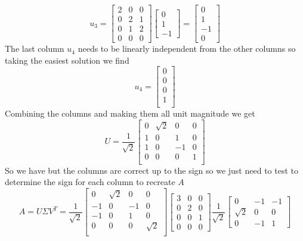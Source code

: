 \documentclass{article}
\begin{document}
$$u_3 =
\begin{bmatrix}
2 & 0 & 0 \\
0 & 2 & 1 \\
0 & 1 & 2 \\
0 & 0 & 0
\end{bmatrix}
\begin{bmatrix}
0 \\
1 \\
-1
\end{bmatrix}
=
\begin{bmatrix}
0 \\
1 \\
-1 \\
0
\end{bmatrix}
$$
The last column $u_4$ needs to be linearly independent from the other columns so taking the easiest solution we find
$$u_4 =
\begin{bmatrix}
0 \\
0 \\
0 \\
1 \\
\end{bmatrix}
$$
Combining the columns and making them all unit magnitude we get
$$ U =
\frac{1}{\sqrt{2}}
\begin{bmatrix}
0 & \sqrt{2} & 0 & 0 \\
1 & 0 & 1 & 0 \\
1 & 0 & -1 & 0 \\
0 & 0 & 0 & 1 \\
\end{bmatrix}
$$
So we have but the columns are correct up to the sign so we just need to test to determine the sign for each column to recreate $A$
$$
A = U\Sigma V^T =
\frac{1}{\sqrt{2}}
\begin{bmatrix}
0 & \sqrt{2} & 0 & 0\\
-1 & 0 & -1 & 0\\
-1 & 0 & 1 & 0\\
0 & 0 & 0 & \sqrt{2}\\
\end{bmatrix}
\begin{bmatrix}
3 & 0 & 0 \\
0 & 2 & 0 \\
0 & 0 & 1 \\
0 & 0 & 0
\end{bmatrix}
\frac{1}{\sqrt{2}}
\begin{bmatrix}
0 & -1 & -1 \\
\sqrt{2} & 0 & 0 \\
0 & -1 & 1
\end{bmatrix}
$$
\end{document}
